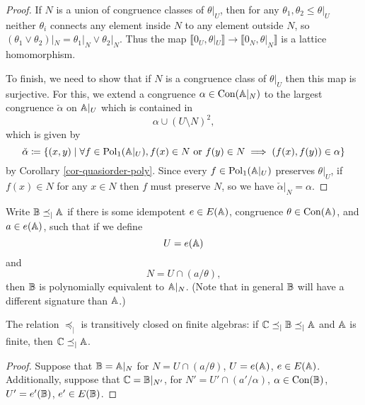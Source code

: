 \begin{appendices}
\begin{proof}
If $N$ is a union of congruence classes of $\theta|_U$, then for any $\theta_1, \theta_2 \le \theta|_U$ neither $\theta_i$ connects any element inside $N$ to any element outside $N$, so $(\theta_1 \vee \theta_2)|_N = \theta_1|_N \vee \theta_2|_N$. Thus the map $\llbracket 0_U, \theta|_U \rrbracket \rightarrow \llbracket 0_N, \theta|_N \rrbracket$ is a lattice homomorphism.

To finish, we need to show that if $N$ is a congruence class of $\theta|_U$ then this map is surjective. For this, we extend a congruence $\alpha \in \operatorname{Con}(\mathbb{A}|_N)$ to the largest congruence $\check{\alpha}$ on $\mathbb{A}|_U$ which is contained in
\[
\alpha \cup (U \setminus N)^2,
\]
which is given by
\[
\check{\alpha} \coloneqq \{(x,y) \mid \forall f \in \operatorname{Pol}_1(\mathbb{A}|_U), f(x) \in N\text{ or }f(y)\in N \implies (f(x),f(y)) \in \alpha\}
\]
by Corollary \ref{cor-quasiorder-poly}. Since every $f \in \operatorname{Pol}_1(\mathbb{A}|_U)$ preserves $\theta|_U$, if $f(x) \in N$ for any $x \in N$ then $f$ must preserve $N$, so we have $\check{\alpha}|_N = \alpha$.
\end{proof}

\begin{defn}\label{defn-restrict-order} Write $\mathbb{B} \preceq_| \mathbb{A}$ if there is some idempotent $e \in E(\mathbb{A})$, congruence $\theta \in \operatorname{Con}(\mathbb{A})$, and $a \in e(\mathbb{A})$, such that if we define
\[
U = e(\mathbb{A})
\]
and
\[
N = U \cap (a/\theta),
\]
then $\mathbb{B}$ is polynomially equivalent to $\mathbb{A}|_N$. (Note that in general $\mathbb{B}$ will have a different signature than $\mathbb{A}$.)
\end{defn}

\begin{prop}\label{prop-restrict-transitive} The relation $\preceq_|$ is transitively closed on finite algebras: if $\mathbb{C} \preceq_| \mathbb{B} \preceq_| \mathbb{A}$ and $\mathbb{A}$ is finite, then $\mathbb{C} \preceq_| \mathbb{A}$.
\end{prop}
\begin{proof} Suppose that $\mathbb{B} = \mathbb{A}|_N$ for $N = U \cap (a/\theta)$, $U = e(\mathbb{A})$, $e \in E(\mathbb{A})$. Additionally, suppose that $\mathbb{C} = \mathbb{B}|_{N'}$, for $N' = U' \cap (a'/\alpha)$, $\alpha \in \operatorname{Con}(\mathbb{B})$, $U' = e'(\mathbb{B})$, $e' \in E(\mathbb{B})$.


\end{proof}
\end{appendices}
